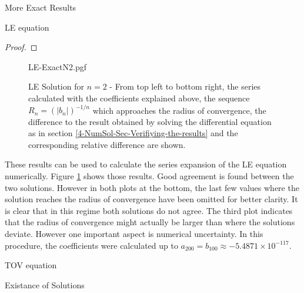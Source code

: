 \begin{section}{More Exact Results}
\begin{subsection}{LE equation}
\begin{proof}
\end{proof}
\begin{figure}[H]
	{LE-ExactN2.pgf}
	\caption[LE Solution for $n=2$]{LE Solution for $n=2$ - From top left to bottom right, 
	the series calculated with the coefficients explained above, 
	the sequence $R_n=(|b_n|)^{-1/n}$ which approaches the radius of convergence, 
	the difference to the result obtained by solving the differential equation 
	as in section \ref{4-NumSol-Sec-Verifiying-the-results} and the corresponding 
	relative difference are shown.}
	\label{5-MoExSo-LEN2-Plot}
\end{figure}\noindent
These results can be used to calculate the series expansion of the LE equation numerically. 
Figure \ref{5-MoExSo-LEN2-Plot} shows those results. Good agreement is found between the two solutions. 
However in both plots at the bottom, the last few values where the solution reaches the 
radius of convergence have been omitted for better clarity. It is clear that in this 
regime both solutions do not agree. The third plot indicates that the radius of 
convergence might actually be larger than where the solutions deviate. 
However one important aspect is numerical uncertainty. In this procedure, 
the coefficients were calculated up to $a_{200}=b_{100}\approx-5.4871\times10^{-117}$.



\end{subsection}
%
%
\begin{subsection}{TOV equation}

\end{subsection}
%
%
\begin{subsection}{Existance of Solutions}

\end{subsection}
\end{section}
